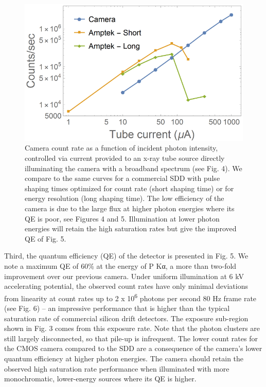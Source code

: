 \begin{figure}[h] \label{cmos26}
\caption{
Camera count rate as a function of incident photon
intensity, controlled via current provided to an x-ray tube source
directly illuminating the camera with a broadband spectrum (see Fig. 4).
We compare to the same curves for a commercial SDD with pulse shaping
times optimized for count rate (short shaping time) or for energy
resolution (long shaping time). The low efficiency of the camera is due
to the large flux at higher photon energies where its QE is poor, see
Figures 4 and 5. Illumination at lower photon energies will retain the
high saturation rates but give the improved QE of Fig. 5.
}
\centering
\includegraphics{NewCameraPaper_1.10.docx1502867018/media/image6.png}
\end{figure}

Third, the quantum efficiency (QE) of the detector is presented in Fig.
5. We note a maximum QE of 60\% at the energy of P Kα, a more than
two-fold improvement over our previous camera. \cite{hoidn2015note} Under
uniform illumination at 6 kV accelerating potential, the observed count
rates have only minimal deviations from linearity at count rates up to 2
x 10\textsuperscript{6} photons per second 80 Hz frame rate (see Fig. 6)
-- an impressive performance that is higher than the typical saturation
rate of commercial silicon drift detectors. The exposure sub-region
shown in Fig. 3 comes from this exposure rate. Note that the photon
clusters are still largely disconnected, so that pile-up is infrequent.
The lower count rates for the CMOS camera compared to the SDD are a
consequence of the camera's lower quantum efficiency at higher photon
energies. The camera should retain the observed high saturation rate
performance when illuminated with more monochromatic, lower-energy
sources where its QE is higher.

